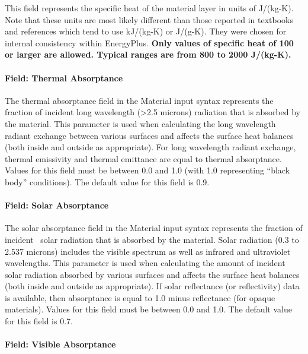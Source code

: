 This field represents the specific heat of the material layer in units of J/(kg-K). Note that these units are most likely different than those reported in textbooks and references which tend to use kJ/(kg-K) or J/(g-K). They were chosen for internal consistency within EnergyPlus. \textbf{Only values of specific heat of 100 or larger are allowed. Typical ranges are from 800 to 2000 J/(kg-K).}

\paragraph{Field: Thermal Absorptance}\label{field-thermal-absorptance}

The thermal absorptance field in the Material input syntax represents the fraction of incident long wavelength (>2.5 microns) radiation that is absorbed by the material. This parameter is used when calculating the long wavelength radiant exchange between various surfaces and affects the surface heat balances (both inside and outside as appropriate). For long wavelength radiant exchange, thermal emissivity and thermal emittance are equal to thermal absorptance. Values for this field must be between 0.0 and 1.0 (with 1.0 representing ``black body'' conditions). The default value for this field is 0.9.

\paragraph{Field: Solar Absorptance}\label{field-solar-absorptance}

The solar absorptance field in the Material input syntax represents the fraction of incident~ solar radiation that is absorbed by the material. Solar radiation (0.3 to 2.537 microns) includes the visible spectrum as well as infrared and ultraviolet wavelengths. This parameter is used when calculating the amount of incident solar radiation absorbed by various surfaces and affects the surface heat balances (both inside and outside as appropriate). If solar reflectance (or reflectivity) data is available, then absorptance is equal to 1.0 minus reflectance (for opaque materials). Values for this field must be between 0.0 and 1.0. The default value for this field is 0.7.

\paragraph{Field: Visible Absorptance}\label{field-visible-absorptance}

